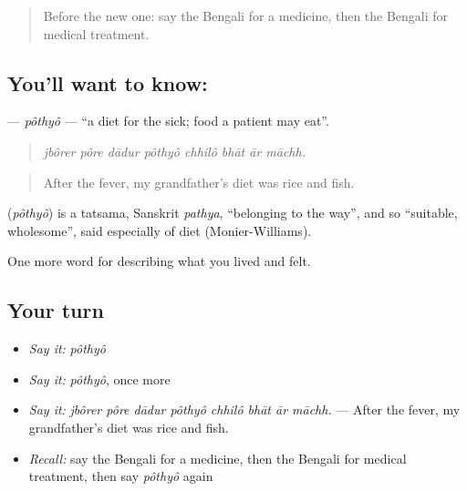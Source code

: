 \label{lesson:BN-C472-pothyo}



\begin{quote}
Before the new one: say the Bengali for a medicine, then the Bengali for medical treatment.
\end{quote}

\subsection*{You'll want to know: }
\textbf{} — \emph{pôthyô} — \textquotedblleft{}a diet for the sick; food a patient may eat\textquotedblright{}.

\begin{quote}
       
\end{quote}

\begin{quote}
\emph{jbôrer pôre dādur pôthyô chhilô bhāt ār māchh.}
\end{quote}

\begin{quote}
After the fever, my grandfather's diet was rice and fish.
\end{quote}

\begin{cousinweb}
\textbf{} (\emph{pôthyô}) is a tatsama, Sanskrit \emph{pathya}, \textquotedblleft{}belonging to the way\textquotedblright{}, and so \textquotedblleft{}suitable, wholesome\textquotedblright{}, said especially of diet (Monier-Williams).
\end{cousinweb}

\begin{grammarlens}[title={What you've built}]
One more word for describing what you lived and felt.
\end{grammarlens}

\subsection*{Your turn}
\begin{itemize}
\raggedright
  \item \emph{Say it:} \emph{pôthyô}
  \item \emph{Say it:} \emph{pôthyô}, once more
  \item \emph{Say it:} \emph{jbôrer pôre dādur pôthyô chhilô bhāt ār māchh.} — After the fever, my grandfather's diet was rice and fish.
  \item \emph{Recall:} say the Bengali for a medicine, then the Bengali for medical treatment, then say \emph{pôthyô} again
\end{itemize}

